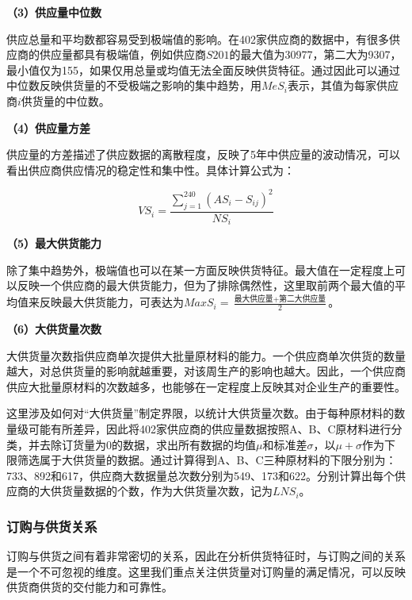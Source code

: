 \documentclass[withoutpreface,bwprint]{cumcmthesis} %
\begin{document}
\begin{spacing}{1.8}\textbf{（3）供应量中位数}\end{spacing}
供应总量和平均数都容易受到极端值的影响。在402家供应商的数据中，有很多供应商的供应量都具有极端值，例如供应商$S201$的最大值为30977，第二大为9307，最小值仅为155，如果仅用总量或均值无法全面反映供货特征。通过因此可以通过中位数反映供货量的不受极端之影响的集中趋势，用$MeS_i$表示，其值为每家供应商$i$供货量的中位数。

\begin{spacing}{1.8}\textbf{（4）供应量方差}\end{spacing}
供应量的方差描述了供应数据的离散程度，反映了5年中供应量的波动情况，可以看出供应商供应情况的稳定性和集中性。具体计算公式为：

\begin{equation}
    VS_i=\frac{\sum_{j = 1}^{240}\left(AS_i-S_{ij}\right)^2 }{NS_i}
\end{equation}

\begin{spacing}{1.8}\textbf{（5）最大供货能力}\end{spacing}
除了集中趋势外，极端值也可以在某一方面反映供货特征。最大值在一定程度上可以反映一个供应商的最大供货能力，但为了排除偶然性，这里取前两个最大值的平均值来反映最大供货能力，可表达为$MaxS_i=\frac{\text{最大供应量}+\text{第二大供应量}}{2} $。

\begin{spacing}{1.8}\textbf{（6）大供货量次数}\end{spacing}
大供货量次数指供应商单次提供大批量原材料的能力。一个供应商单次供货的数量越大，对总供货量的影响就越重要，对该周生产的影响也越大。因此，一个供应商供应大批量原材料的次数越多，也能够在一定程度上反映其对企业生产的重要性。

这里涉及如何对“大供货量”制定界限，以统计大供货量次数。由于每种原材料的数量级可能有所差异，因此将402家供应商的供应量数据按照A、B、C原材料进行分类，并去除订货量为0的数据，求出所有数据的均值$\mu $和标准差$\sigma$，以$\mu +\sigma$作为下限筛选属于大供货量的数据。通过计算得到A、B、C三种原材料的下限分别为：733、892和617，供应商大数据量总次数分别为549、173和622。分别计算出每个供应商的大供货量数据的个数，作为大供货量次数，记为$LNS_i$。

\subsubsection{订购与供货关系}%
订购与供货之间有着非常密切的关系，因此在分析供货特征时，与订购之间的关系是一个不可忽视的维度。这里我们重点关注供货量对订购量的满足情况，可以反映供货商供货的交付能力和可靠性。
\end{document}
